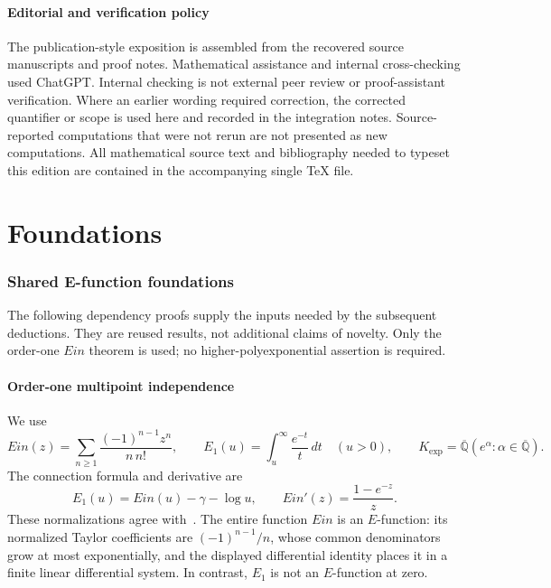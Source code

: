 \documentclass[11pt,a4paper]{article}
\theoremstyle{definition}
\theoremstyle{remark}
\theoremstyle{plain}
\numberwithin{equation}{section}
\def\operatorname#1{#1}\def\mathrm#1{#1}}
\begin{document}
\subsection{Editorial and verification policy}
The publication-style exposition is assembled from the recovered source
manuscripts and proof notes. Mathematical assistance and internal
cross-checking used ChatGPT. Internal checking is not external peer
review or proof-assistant verification. Where an earlier wording required
correction, the corrected quantifier or scope is used here and recorded
in the integration notes. Source-reported computations that were not
rerun are not presented as new computations. All mathematical source
text and bibliography needed to typeset this edition are contained in
the accompanying single TeX file.


\clearpage
\part{Foundations}

\section{Shared E-function foundations}
\label{sc:app:dependencies}\label{sc:sec:reused-inputs}

The following dependency proofs supply the inputs needed by the
subsequent deductions. They are reused results, not additional claims of
novelty. Only the order-one $\operatorname{Ein}$ theorem is used; no
higher-polyexponential assertion is required. 

\subsection{Order-one multipoint independence}
\label{sc:dep:ein}

We use
\[
 \operatorname{Ein}(z)=\sum_{n\ge1}\frac{(-1)^{n-1}z^n}{n\,n!},
 \qquad E_1(u)=\int_u^\infty\frac{e^{-t}}t\,dt\quad(u>0),
 \qquad K_{\exp}=\overline{\mathbb Q}
       (e^\alpha:\alpha\in\overline{\mathbb Q}).
\]
The connection formula and derivative are
\begin{equation}\label{sc:dep:connection}
 E_1(u)=\operatorname{Ein}(u)-\gamma-\log u,
 \qquad \operatorname{Ein}'(z)=\frac{1-e^{-z}}z.
\end{equation}
These normalizations agree with~\cite[\S6.2]{DLMF}.
The entire function $\operatorname{Ein}$ is an $E$-function: its
normalized Taylor coefficients are $(-1)^{n-1}/n$, whose common
denominators grow at most exponentially, and the displayed differential
identity places it in a finite linear differential system. In contrast,
$E_1$ is not an $E$-function at zero.
\end{document}
